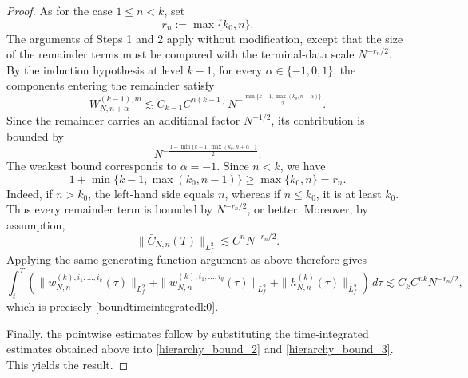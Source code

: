 \documentclass[pdflatex,sn-mathphys-num]{sn-jnl}
\theoremstyle{thmstyleone}%
\theoremstyle{thmstyletwo}%
\theoremstyle{thmstylethree}%
\begin{document}
\begin{proof}
\noindent
As for the case \(1\leq n<k\), set
\[
r_n:=\max\{k_0,n\}.
\]
The arguments of Steps 1 and 2 apply without modification, except that
the size of the remainder terms must be compared with the terminal-data
scale \(N^{-r_n/2}\). By the induction hypothesis at level \(k-1\),
for every \(\alpha\in\{-1,0,1\}\), the components entering the
remainder satisfy
\[
W_{N,n+\alpha}^{(k-1),m}
\lesssim
C_{k-1}C^{n(k-1)}
N^{-\frac{\min\{k-1,\max(k_0,n+\alpha)\}}{2}}.
\]
Since the remainder carries an additional factor \(N^{-1/2}\), its
contribution is bounded by
\[
N^{-\frac{
1+\min\{k-1,\max(k_0,n+\alpha)\}
}{2}}.
\]
The weakest bound corresponds to \(\alpha=-1\). Since \(n<k\), we have
\[
1+\min\{k-1,\max(k_0,n-1)\}
\geq \max\{k_0,n\}=r_n.
\]
Indeed, if \(n>k_0\), the left-hand side equals \(n\), whereas if
\(n\leq k_0\), it is at least \(k_0\). Thus every remainder term is
bounded by \(N^{-r_n/2}\), or better. Moreover, by assumption,
\[
\|\bar C_{N,n}(T)\|_{L_f^2}
\lesssim C^n N^{-r_n/2}.
\]
Applying the same generating-function argument as above therefore gives
\[
\int_t^T
\left(
\|w_{N,n}^{(k),i_1,\ldots,i_k}(\tau)\|_{L_f^2}
+
\|w_{N,n}^{(k),i_1,\ldots,i_q}(\tau)\|_{L_f^2}
+
\|h_{N,n}^{(k)}(\tau)\|_{L_f^2}
\right)\,d\tau
\lesssim
C_k C^{nk}N^{-r_n/2},
\]
which is precisely \eqref{boundtimeintegratedk0}.\\

\noindent

Finally, the pointwise estimates follow by substituting the time-integrated estimates obtained above into \eqref{hierarchy_bound_2} and \eqref{hierarchy_bound_3}. This yields the result.
\end{proof}
\end{document}
